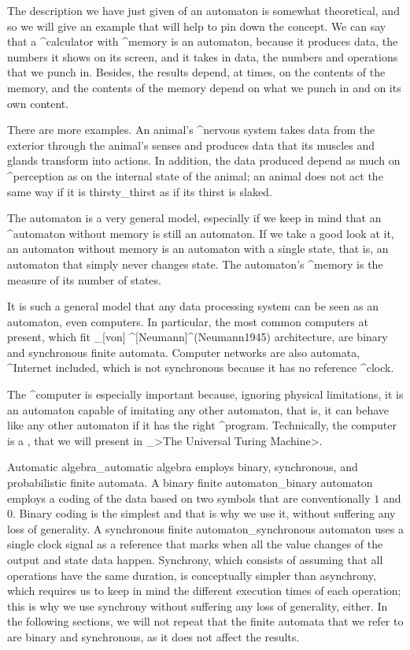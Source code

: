 The description we have just given of an automaton is somewhat
theoretical, and so we will give an example that will help to pin down
the concept. We can say that a ^{calculator} with ^{memory} is an
automaton, because it produces data, the numbers it shows on its screen,
and it takes in data, the numbers and operations that we punch in.
Besides, the results depend, at times, on the contents of the memory,
and the contents of the memory depend on what we punch in and on its own
content.

There are more examples. An animal's ^{nervous system} takes data from
the exterior through the animal's senses and produces data that its
muscles and glands transform into actions. In addition, the data
produced depend as much on ^{perception} as on the internal state of the
animal; an animal does not act the same way if it is thirsty_{thirst} as
if its thirst is slaked.

The automaton is a very general model, especially if we keep in mind
that an ^{automaton without memory} is still an automaton. If we take a
good look at it, an automaton without memory is an automaton with a
single state, that is, an automaton that simply never changes state. The
automaton's ^{memory} is the measure of its number of states.

It is such a general model that any data processing system can be seen
as an automaton, even computers. In particular, the most common
computers at present, which fit _[von] ^[Neumann]^(Neumann1945)
architecture, are binary and synchronous finite automata. Computer
networks are also automata, ^{Internet} included, which is not
synchronous because it has no reference ^{clock}.

The ^{computer} is especially important because, ignoring physical
limitations, it is an automaton capable of imitating any other
automaton, that is, it can behave like any other automaton if it has the
right ^{program}. Technically, the computer is a {\UP}, that we will
present in _>The Universal Turing Machine>.

Automatic algebra_{automatic algebra} employs binary, synchronous, and
probabilistic finite automata. A binary finite automaton_{binary
automaton} employs a coding of the data based on two symbols that are
conventionally $1$ and $0$. Binary coding is the simplest and that is
why we use it, without suffering any loss of generality. A synchronous
finite automaton_{synchronous automaton} uses a single clock signal as a
reference that marks when all the value changes of the output and state
data happen. Synchrony, which consists of assuming that all operations
have the same duration, is conceptually simpler than asynchrony, which
requires us to keep in mind the different execution times of each
operation; this is why we use synchrony without suffering any loss of
generality, either. In the following sections, we will not repeat that
the finite automata that we refer to are binary and synchronous, as it
does not affect the results.

